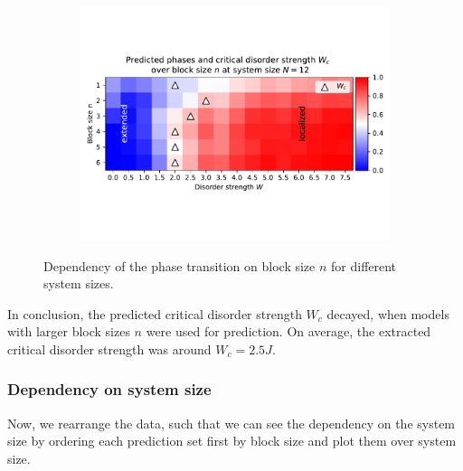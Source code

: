 \documentclass[reprint,amsmath,amssymb,aps,prb]{revtex4-2}
\begin{document}
\begin{center}
\begin{figure}[ht!]
\begin{subfigure}[c]{0.4\textwidth}
			\includegraphics[width=\textwidth, trim={0 2cm 0 3cm},clip]{../results/Wc/N12_Wc_n_dependency.pdf}
		\end{subfigure}
		\caption{Dependency of the phase transition on block size $n$ for different system sizes.}
		\label{fig:wcextractn}
	\end{figure}
\end{center}

In conclusion, the predicted critical disorder strength $W_c$ decayed, when models with larger block sizes $n$ were used for prediction. On average, the extracted critical disorder strength was around $W_c=2.5J$.

\subsubsection{Dependency on system size}

Now, we rearrange the data, such that we can see the dependency on the system size by ordering each prediction set first by block size and plot them over system size. 
\end{document}
